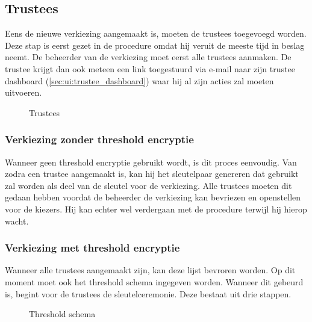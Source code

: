 \subsection{Trustees}
\label{sec:proc:trustees}

Eens de nieuwe verkiezing aangemaakt is, moeten de trustees toegevoegd worden. Deze stap is eerst gezet in de procedure omdat hij veruit de meeste tijd in beslag neemt. De beheerder van de verkiezing moet eerst alle trustees aanmaken. De trustee krijgt dan ook meteen een link toegestuurd via e-mail naar zijn trustee dashboard (\ref{sec:ui:trustee_dashboard}) waar hij al zijn acties zal moeten uitvoeren.

\begin{figure}
  \caption{Trustees}
  \label{fig:proc:trustees_view}
\end{figure}

\subsubsection{Verkiezing zonder threshold encryptie}


Wanneer geen threshold encryptie gebruikt wordt, is dit proces eenvoudig. Van zodra een trustee aangemaakt is, kan hij het sleutelpaar genereren dat gebruikt zal worden als deel van de sleutel voor de verkiezing. Alle trustees moeten dit gedaan hebben voordat de beheerder de verkiezing kan bevriezen en openstellen voor de kiezers. Hij kan echter wel verdergaan met de procedure terwijl hij hierop wacht.

\subsubsection{Verkiezing met threshold encryptie}

\npar Wanneer alle trustees aangemaakt zijn, kan deze lijst bevroren worden. Op dit moment moet ook het threshold schema ingegeven worden. Wanneer dit gebeurd is, begint voor de trustees de sleutelceremonie. Deze bestaat uit drie stappen.

\begin{figure}
  \caption{Threshold schema}
  \label{fig:proc:trustees_freeze}
\end{figure}


